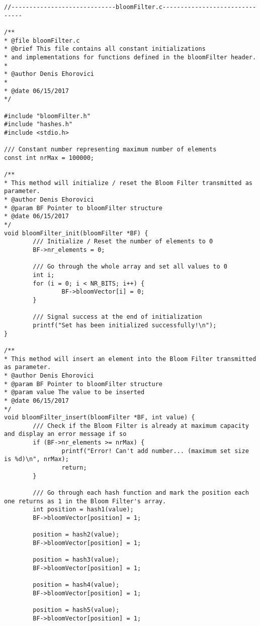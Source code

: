 \documentclass[14pt]{article}
\begin{document}
\begin{lstlisting}
//-----------------------------bloomFilter.c-------------------------------

/**
* @file bloomFilter.c
* @brief This file contains all constant initializations
* and implementations for functions defined in the bloomFilter header.
*
* @author Denis Ehorovici
*
* @date 06/15/2017
*/

#include "bloomFilter.h"
#include "hashes.h"
#include <stdio.h>

/// Constant number representing maximum number of elements
const int nrMax = 100000;

/**
* This method will initialize / reset the Bloom Filter transmitted as parameter.
* @author Denis Ehorovici
* @param BF Pointer to bloomFilter structure
* @date 06/15/2017
*/
void bloomFilter_init(bloomFilter *BF) {
        /// Initialize / Reset the number of elements to 0
        BF->nr_elements = 0;

        /// Go through the whole array and set all values to 0
        int i;
        for (i = 0; i < NR_BITS; i++) {
                BF->bloomVector[i] = 0;
        }

        /// Signal success at the end of initialization
        printf("Set has been initialized successfully!\n");
}

/**
* This method will insert an element into the Bloom Filter transmitted as parameter.
* @author Denis Ehorovici
* @param BF Pointer to bloomFilter structure
* @param value The value to be inserted
* @date 06/15/2017
*/
void bloomFilter_insert(bloomFilter *BF, int value) {
        /// Check if the Bloom Filter is already at maximum capacity and display an error message if so
        if (BF->nr_elements >= nrMax) {
                printf("Error! Can't add number... (maximum set size is %d)\n", nrMax);
                return;
        }

        /// Go through each hash function and mark the position each one returns as 1 in the Bloom Filter's array.
        int position = hash1(value);
        BF->bloomVector[position] = 1;

        position = hash2(value);
        BF->bloomVector[position] = 1;

        position = hash3(value);
        BF->bloomVector[position] = 1;

        position = hash4(value);
        BF->bloomVector[position] = 1;

        position = hash5(value);
        BF->bloomVector[position] = 1;


\end{lstlisting}
\end{document}

